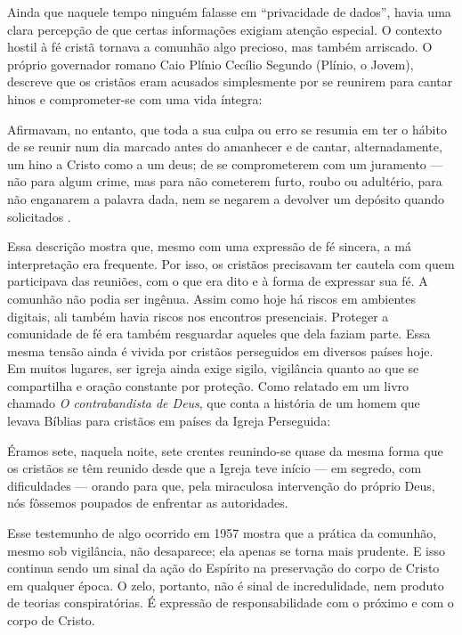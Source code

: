 Ainda que naquele tempo ninguém falasse em “privacidade de dados”, havia uma clara percepção de que certas informações exigiam atenção especial. O contexto hostil à fé cristã tornava a comunhão algo precioso, mas também arriscado. O próprio governador romano Caio Plínio Cecílio Segundo (Plínio, o Jovem), descreve que os cristãos eram acusados simplesmente por se reunirem para cantar hinos e comprometer-se com uma vida íntegra:

\begin{citacao}
    Afirmavam, no entanto, que toda a sua culpa ou erro se resumia em ter o hábito de se reunir num dia marcado antes do amanhecer e de cantar, alternadamente, um hino a Cristo como a um deus; de se comprometerem com um juramento — não para algum crime, mas para não cometerem furto, roubo ou adultério, para não enganarem a palavra dada, nem se negarem a devolver um depósito quando solicitados \cite[p.~272]{plinioCartasX}.
\end{citacao}

Essa descrição mostra que, mesmo com uma expressão de fé sincera, a má interpretação era frequente. Por isso, os cristãos precisavam ter cautela com quem participava das reuniões, com o que era dito e à forma de expressar sua fé. A comunhão não podia ser ingênua. Assim como hoje há riscos em ambientes digitais, ali também havia riscos nos encontros presenciais. Proteger a comunidade de fé era também resguardar aqueles que dela faziam parte. Essa mesma tensão ainda é vivida por cristãos perseguidos em diversos países hoje. Em muitos lugares, ser igreja ainda exige sigilo, vigilância quanto ao que se compartilha e oração constante por proteção. Como relatado em um livro chamado \textit{O contrabandista de Deus}, que conta a história de um homem que levava Bíblias para cristãos em países da Igreja Perseguida:

\begin{citacao}
    Éramos sete, naquela noite, sete crentes reunindo-se quase da mesma forma que os cristãos se têm reunido desde que a Igreja teve início — em segredo, com dificuldades — orando para que, pela miraculosa intervenção do próprio Deus, nós fôssemos poupados de enfrentar as autoridades. \cite[p.~166]{brotherAndrew}
\end{citacao}

Esse testemunho de algo ocorrido em 1957 mostra que a prática da comunhão, mesmo sob vigilância, não desaparece; ela apenas se torna mais prudente. E isso continua sendo um sinal da ação do Espírito na preservação do corpo de Cristo em qualquer época. O zelo, portanto, não é sinal de incredulidade, nem produto de teorias conspiratórias. É expressão de responsabilidade com o próximo e com o corpo de Cristo.

